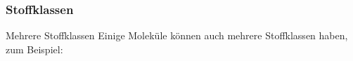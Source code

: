 \begin{frame}
\frametitle{Stoffklassen}
\begin{alertblock}{Mehrere Stoffklassen}
	Einige Moleküle können auch mehrere Stoffklassen haben, zum Beispiel:

	\vspace{20pt}

\end{alertblock}
\end{frame}
